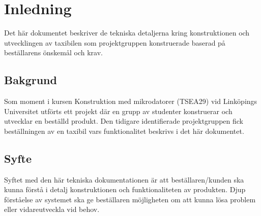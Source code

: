 \documentclass[tekniskrapport/tech.tex]{subfiles}
\begin{document}
\section{Inledning}
Det här dokumentet beskriver de tekniska detaljerna kring konstruktionen och utvecklingen av taxibilen som projektgruppen konstruerade baserad på beställarens önskemål och krav.    

\subsection{Bakgrund}
Som moment i kursen Konstruktion med mikrodatorer (TSEA29) vid Linköpings Universitet utförts ett projekt där en grupp av studenter konstruerar och utvecklar en beställd produkt. Den tidigare identifierade projektgruppen fick beställningen av en taxibil vars funktionalitet beskrivs i det här dokumentet. 

\subsection{Syfte}
Syftet med den här tekniska dokumentationen är att beställaren/kunden ska kunna förstå i detalj konstruktionen och funktionaliteten av produkten. Djup förståelse av systemet ska ge beställaren möjligheten om att kunna lösa problem eller vidareutveckla vid behov. 
\end{document}
